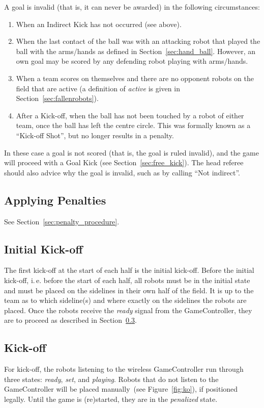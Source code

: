 \documentclass[12pt]{article}
\newcommand{\ie}{\mbox{i.\,e.}\xspace}
\newcommand{\cf}{see\xspace}
\begin{document}
A goal is invalid (that is, it can never be awarded) in the following circumstances:
\begin{enumerate}
    \item When an Indirect Kick has not occurred (see above).
    \item When the last contact of the ball was with an attacking robot that played the ball with the arms/hands as defined in Section~\ref{sec:hand_ball}. However, an own goal may be scored by any defending robot playing with arms/hands.
    \item When a team scores on themselves and there are no opponent robots on the field that are active (a definition of \emph{active} is given in Section~\ref{sec:fallenrobots}).
    \item After a Kick-off, when the ball has not been touched by a robot of either team, once the ball has left the centre circle. This was formally known as a ``Kick-off Shot'', but no longer results in a penalty.
\end{enumerate}

In these case a goal is not scored (that is, the goal is ruled invalid), and the game will proceed with a Goal Kick (\cf Section~\ref{sec:free_kick}). The head referee should also advice why the goal is invalid, such as by calling ``Not indirect''.

\subsection{Applying Penalties}

See Section~\ref{sec:penalty_procedure}.


\subsection{Initial Kick-off}
\label{sec:initial-kick-off}

The first kick-off at the start of each half is the initial kick-off.
Before the initial kick-off, \ie before the start of each half, all robots must be in the initial state and must be placed on the sidelines in their own half of the field.
It is up to the team as to which sideline(s) and where exactly on the sidelines the robots are placed.
Once the robots receive the \emph{ready} signal from the GameController, they are to proceed as described in Section~\ref{sec:kick-off}.


\subsection{Kick-off}
\label{sec:kick-off}
For kick-off, the robots listening to the wireless GameController run through three states: \emph{ready}, \emph{set}, and \emph{playing}. 
Robots that do not listen to the GameController will be placed manually~(see Figure~\ref{fig:ko}), if positioned legally.
Until the game is (re)started, they are in the \emph{penalized} state.
\end{document}
